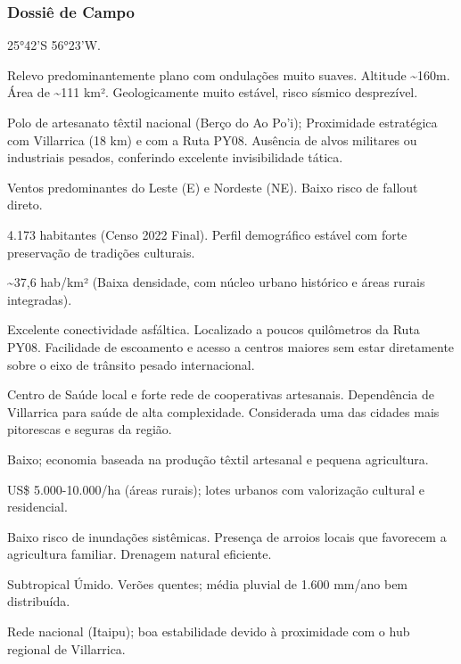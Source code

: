 \subsubsection{Dossiê de Campo}
\begin{description}[style=nextline,leftmargin=0.5cm,font=\bfseries]
\item[Coordenadas]  25°42'S 56°23'W.
\item[Topografia]  Relevo predominantemente plano com ondulações muito suaves. Altitude \textasciitilde 160m. Área de \textasciitilde 111 km². Geologicamente muito estável, risco sísmico desprezível.
\item[Alvos Estratégicos]  Polo de artesanato têxtil nacional (Berço do Ao Po'i); Proximidade estratégica com Villarrica (18 km) e com a Ruta PY08. Ausência de alvos militares ou industriais pesados, conferindo excelente invisibilidade tática.
\item[Fallout]  Ventos predominantes do Leste (E) e Nordeste (NE). Baixo risco de fallout direto.
\item[População]  4.173 habitantes (Censo 2022 Final). Perfil demográfico estável com forte preservação de tradições culturais.
\item[Densidade]  \textasciitilde 37,6 hab/\allowbreak km² (Baixa densidade, com núcleo urbano histórico e áreas rurais integradas).
\item[Vias de Acesso]  Excelente conectividade asfáltica. Localizado a poucos quilômetros da Ruta PY08. Facilidade de escoamento e acesso a centros maiores sem estar diretamente sobre o eixo de trânsito pesado internacional.
\item[Serviços]  Centro de Saúde local e forte rede de cooperativas artesanais. Dependência de Villarrica para saúde de alta complexidade. Considerada uma das cidades mais pitorescas e seguras da região.
\item[Custo de Vida]  Baixo; economia baseada na produção têxtil artesanal e pequena agricultura.
\item[Preço da Terra]  US\$ 5.000-10.000/\allowbreak ha (áreas rurais); lotes urbanos com valorização cultural e residencial.
\item[Hidrologia]  Baixo risco de inundações sistêmicas. Presença de arroios locais que favorecem a agricultura familiar. Drenagem natural eficiente.
\item[Clima]  Subtropical Úmido. Verões quentes; média pluvial de 1.600 mm/\allowbreak ano bem distribuída.
\item[Energia]  Rede nacional (Itaipu); boa estabilidade devido à proximidade com o hub regional de Villarrica.

\end{description}
